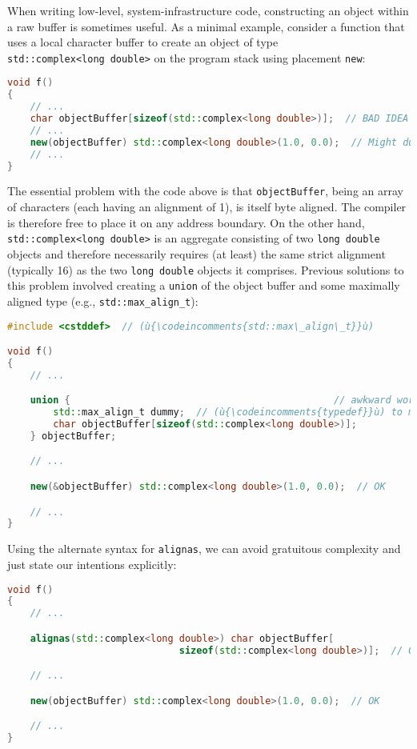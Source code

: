When writing low-level, system-infrastructure code, constructing an object within a raw buffer is sometimes useful. As a minimal
example, consider a function that uses a local character buffer to
create an object of type \texttt{std::complex<long}~\texttt{double>} on
the program stack using placement \texttt{new}:

\begin{lstlisting}[language=C++]
void f()
{
    // ...
    char objectBuffer[sizeof(std::complex<long double>)];  // BAD IDEA
    // ...
    new(objectBuffer) std::complex<long double>(1.0, 0.0);  // Might dump core!
    // ...
}
\end{lstlisting}
    
\noindent The essential problem with the code above is that \texttt{objectBuffer},
being an array of characters (each having an alignment of 1), is itself
byte aligned. The compiler is therefore free to place it on any address
boundary. On the other hand, \texttt{std::complex<long}~\texttt{double>} is an aggregate consisting of two \texttt{long}~\texttt{double} objects
and therefore necessarily requires (at least) the same strict alignment
(typically 16) as the two \texttt{long}~\texttt{double} objects it comprises. Previous
solutions to this problem involved creating a \texttt{union} of the
object buffer and some maximally aligned type (e.g.,
\texttt{std::max\_align\_t}):

\begin{lstlisting}[language=C++]
#include <cstddef>  // (ù{\codeincomments{std::max\_align\_t}}ù)

void f()
{
    // ...

    union {                                              // awkward workaround
        std::max_align_t dummy;  // (ù{\codeincomments{typedef}}ù) to maximally aligned type
        char objectBuffer[sizeof(std::complex<long double>)];
    } objectBuffer;

    // ...

    new(&objectBuffer) std::complex<long double>(1.0, 0.0);  // OK

    // ...
}
\end{lstlisting}
    
\noindent Using the alternate syntax for \texttt{alignas}, we can avoid gratuitous
complexity and just state our intentions explicitly:

\begin{lstlisting}[language=C++]
void f()
{
    // ...

    alignas(std::complex<long double>) char objectBuffer[
                              sizeof(std::complex<long double>)];  // GOOD IDEA

    // ...

    new(objectBuffer) std::complex<long double>(1.0, 0.0);  // OK

    // ...
}
\end{lstlisting}
    

